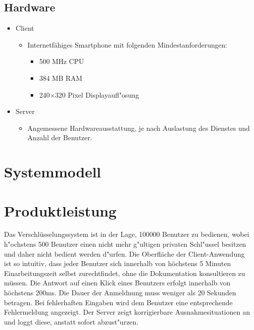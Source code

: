 \documentclass[a4paper,10pt]{scrartcl}
\begin{document}
\subsection{Hardware}
\begin{itemize}
\item Client
   \begin{itemize}
      \item Internetfähiges Smartphone mit folgenden Mindestanforderungen:
         \begin{itemize}
         \item 500 MHz CPU
         \item 384 MB RAM
         \item 240$\times$320 Pixel Displayaufl"osung
      \end{itemize}
   \end{itemize}
\item Server
   \begin{itemize}
      \item Angemessene Hardwareausstattung, je nach Auslastung des Dienstes und
            Anzahl der Benutzer.
   \end{itemize}
\end{itemize}

\section{Systemmodell}





\section{Produktleistung}

\begin{usecase}
 {Das Verschlüsselungssystem ist in der Lage, 100000 Benutzer zu bedienen,
                wobei h"ochstens 500 Benutzer einen nicht mehr g"ultigen privaten Schl"ussel
                besitzen und daher nicht bedient werden d"urfen.}
 {Die Oberfläche der Client-Anwendung ist so intuitiv, dass jeder Benutzer
                sich innerhalb von höchstens 5 Minuten Einarbeitungszeit selbst
                zurechtfindet, ohne die Dokumentation konsultieren zu müssen.}
 {Die Antwort auf einen Klick eines Benutzers erfolgt innerhalb von
                höchstens 200ms.}
 {Die Dauer der Anmeldnung muss weniger als 20 Sekunden betragen.}
 {Bei fehlerhaften Eingaben wird dem Benutzer eine entsprechende
                Fehlermeldung angezeigt.}
 {Der Server zeigt korrigierbare Ausnahmesituationen an und loggt diese,
                anstatt sofort abzust"urzen.}
\end{usecase}
\end{document}
